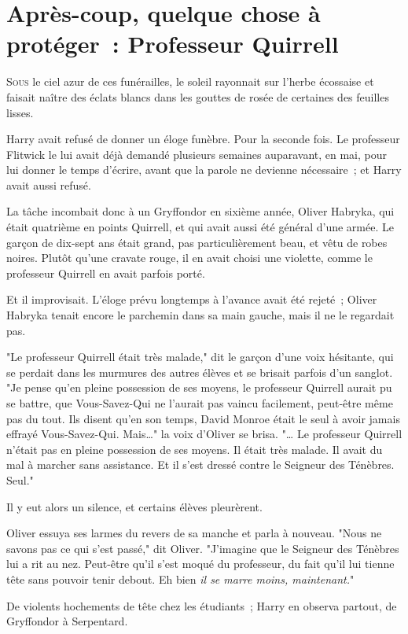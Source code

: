 \chapter{Après-coup, quelque chose à protéger~: Professeur Quirrell}

\lettrine{S}{ous} le ciel azur de ces funérailles, le soleil rayonnait sur l'herbe écossaise et faisait naître des éclats blancs dans les gouttes de rosée de certaines des feuilles lisses.

Harry avait refusé de donner un éloge funèbre. Pour la seconde fois. Le professeur Flitwick le lui avait déjà demandé plusieurs semaines auparavant, en mai, pour lui donner le temps d'écrire, avant que la parole ne devienne nécessaire~; et Harry avait aussi refusé.

La tâche incombait donc à un Gryffondor en sixième année, Oliver Habryka, qui était quatrième en points Quirrell, et qui avait aussi été général d'une armée. Le garçon de dix-sept ans était grand, pas particulièrement beau, et vêtu de robes noires. Plutôt qu'une cravate rouge, il en avait choisi une violette, comme le professeur Quirrell en avait parfois porté.

Et il improvisait. L'éloge prévu longtemps à l'avance avait été rejeté~; Oliver Habryka tenait encore le parchemin dans sa main gauche, mais il ne le regardait pas.

"Le professeur Quirrell était très malade," dit le garçon d'une voix hésitante, qui se perdait dans les murmures des autres élèves et se brisait parfois d'un sanglot. "Je pense qu'en pleine possession de ses moyens, le professeur Quirrell aurait pu se battre, que Vous-Savez-Qui ne l'aurait pas vaincu facilement, peut-être même pas du tout. Ils disent qu'en son temps, David Monroe était le seul à avoir jamais effrayé Vous-Savez-Qui. Mais…" la voix d'Oliver se brisa. "… Le professeur Quirrell n'était pas en pleine possession de ses moyens. Il était très malade. Il avait du mal à marcher sans assistance. Et il s'est dressé contre le Seigneur des Ténèbres. Seul."

Il y eut alors un silence, et certains élèves pleurèrent.

Oliver essuya ses larmes du revers de sa manche et parla à nouveau. "Nous ne savons pas ce qui s'est passé," dit Oliver. "J'imagine que le Seigneur des Ténèbres lui a rit au nez. Peut-être qu'il s'est moqué du professeur, du fait qu'il lui tienne tête sans pouvoir tenir debout. Eh bien \emph{il se marre moins, maintenant.}"

De violents hochements de tête chez les étudiants~; Harry en observa partout, de Gryffondor à Serpentard.

